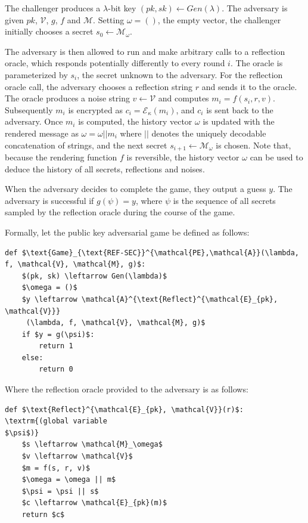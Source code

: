 \documentclass[conference, letterpaper, 10pt]{IEEEtran}
\begin{document}
The challenger produces a $\lambda$-bit key $(pk, sk) \leftarrow
Gen(\lambda)$. The adversary is given $pk$, $\mathcal{V}$, $g$, $f$ and
$\mathcal{M}$.
Setting $\omega = ()$, the empty vector, the challenger initially chooses
a secret $s_0 \leftarrow \mathcal{M}_\omega$.

The adversary is then allowed to run and make arbitrary calls to a reflection
oracle, which responds potentially differently to every round $i$. The oracle
is parameterized by $s_i$, the secret unknown to the
adversary.  For the reflection oracle call, the adversary chooses a reflection
string $r$ and sends it to the oracle. The oracle produces a noise string
$v \leftarrow \mathcal{V}$ and computes $m_i = f(s_i, r, v)$. Subsequently
$m_i$ is encrypted as $c_i = \mathcal{E}_\kappa(m_i)$, and $c_i$ is sent back
to the adversary. Once $m_i$ is computed, the history vector $\omega$ is updated
with the rendered message as $\omega = \omega || m_i$ where $||$ denotes the
uniquely decodable concatenation of strings, and the next secret $s_{i+1}
\leftarrow \mathcal{M}_\omega$ is chosen. Note that, because the rendering
function $f$ is reversible, the history vector $\omega$ can be used to deduce
the history of all secrets, reflections and noises.

When the adversary decides to complete the game, they output a guess $y$. The
adversary is successful if $g(\psi) = y$, where $\psi$ is the sequence
of all secrets sampled by the reflection oracle during the course of the game.

Formally, let the public key adversarial game be defined as follows:

\begin{lstlisting}[texcl,mathescape,basicstyle=\small]
def $\text{Game}_{\text{REF-SEC}}^{\mathcal{PE},\mathcal{A}}(\lambda, f, \mathcal{V}, \mathcal{M}, g)$:
    $(pk, sk) \leftarrow Gen(\lambda)$
    $\omega = ()$
    $y \leftarrow \mathcal{A}^{\text{Reflect}^{\mathcal{E}_{pk}, \mathcal{V}}}
     (\lambda, f, \mathcal{V}, \mathcal{M}, g)$
    if $y = g(\psi)$:
        return 1
    else:
        return 0
\end{lstlisting}

Where the reflection oracle provided to the adversary is as follows:

\begin{lstlisting}[texcl,mathescape,basicstyle=\small]
def $\text{Reflect}^{\mathcal{E}_{pk}, \mathcal{V}}(r)$: \textrm{(global variable
$\psi$)}
    $s \leftarrow \mathcal{M}_\omega$
    $v \leftarrow \mathcal{V}$
    $m = f(s, r, v)$
    $\omega = \omega || m$
    $\psi = \psi || s$
    $c \leftarrow \mathcal{E}_{pk}(m)$
    return $c$
\end{lstlisting}
\end{document}
